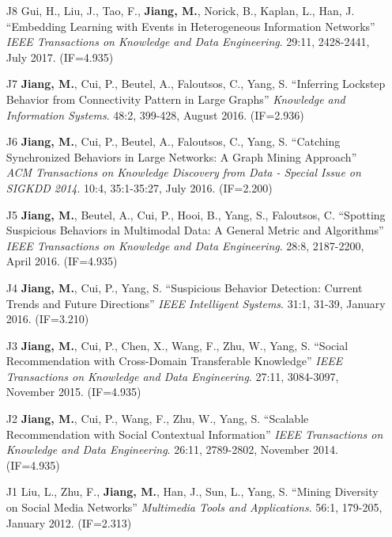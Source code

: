 \documentclass[10pt]{article}
\newenvironment{myindentpar}[1]%
{\begin{list}{}%
         {\setlength{\leftmargin}{#1}}%
         \item[]%
}
{\end{list}}
\newcounter{list}
\begin{document}
\begin{myindentpar}{0.00cm}
\begin{enumerate}[leftmargin=.5cm]
\item[J8] Gui, H., Liu, J., Tao, F., \textbf{Jiang, M.}, Norick, B., Kaplan, L., Han, J. ``Embedding Learning with Events in Heterogeneous Information Networks'' \textit{IEEE Transactions on Knowledge and Data Engineering}. 29:11, 2428-2441, July 2017. (IF=4.935)

\item[J7] \textbf{Jiang, M.}, Cui, P., Beutel, A., Faloutsos, C., Yang, S. ``Inferring Lockstep Behavior from Connectivity Pattern in Large Graphs'' \textit{Knowledge and Information Systems}. 48:2, 399-428, August 2016. (IF=2.936)

\item[J6] \textbf{Jiang, M.}, Cui, P., Beutel, A., Faloutsos, C., Yang, S. ``Catching Synchronized Behaviors in Large Networks: A Graph Mining Approach'' \textit{ACM Transactions on Knowledge Discovery from Data - Special Issue on SIGKDD 2014}. 10:4, 35:1-35:27, July 2016. (IF=2.200)

\item[J5] \textbf{Jiang, M.}, Beutel, A., Cui, P., Hooi, B., Yang, S., Faloutsos, C. ``Spotting Suspicious Behaviors in Multimodal Data: A General Metric and Algorithms'' \textit{IEEE Transactions on Knowledge and Data Engineering}. 28:8, 2187-2200, April 2016. (IF=4.935)

\item[J4] \textbf{Jiang, M.}, Cui, P., Yang, S. ``Suspicious Behavior Detection: Current Trends and Future Directions'' \textit{IEEE Intelligent Systems}. 31:1, 31-39, January 2016. (IF=3.210)

\item[J3] \textbf{Jiang, M.}, Cui, P., Chen, X., Wang, F., Zhu, W., Yang, S. ``Social Recommendation with Cross-Domain Transferable Knowledge'' \textit{IEEE Transactions on Knowledge and Data Engineering}. 27:11, 3084-3097, November 2015. (IF=4.935)

\item[J2] \textbf{Jiang, M.}, Cui, P., Wang, F., Zhu, W., Yang, S. ``Scalable Recommendation with Social Contextual Information'' \textit{IEEE Transactions on Knowledge and Data Engineering}. 26:11, 2789-2802, November 2014. (IF=4.935)

\item[J1] Liu, L., Zhu, F., \textbf{Jiang, M.}, Han, J., Sun, L., Yang, S. ``Mining Diversity on Social Media Networks'' \textit{Multimedia Tools and Applications}. 56:1, 179-205, January 2012. (IF=2.313)

\end{enumerate}


\end{myindentpar}
\end{document}
